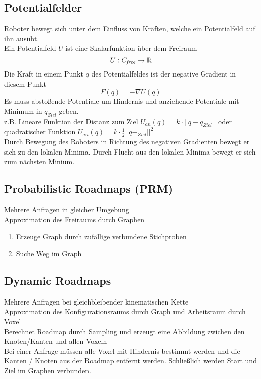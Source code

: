 \subsection{Potentialfelder}
Roboter bewegt sich unter dem Einfluss von Kräften, welche ein Potentialfeld auf ihn ausübt.\\
Ein Potentialfeld \(U\) ist eine Skalarfunktion über dem Freiraum \[U: C_{\mathit{free}} \rightarrow \mathbb{R}\]
Die Kraft in einem Punkt \(q\) des Potentialfeldes ist der negative Gradient in diesem Punkt
\[F(q) = - \nabla U(q)\]
Es muss abstoßende Potentiale um Hindernis und anziehende Potentiale mit Minimum in \(q_{\mathit{Ziel}}\) geben.\\
z.B. Lineare Funktion der Distanz zum Ziel \( U_{\mathit{an}}(q) = k \cdot || q - q_{\mathit{Ziel}} ||\)
oder quadratischer Funktion \(U_{\mathit{an}}(q) = k \cdot \frac{1}{2} {|| q - _{\mathit{Ziel}}||}^2\)\\
Durch Bewegung des Roboters in Richtung des negativen Gradienten bewegt er sich zu den lokalen Minima.
Durch Flucht aus den lokalen Minima bewegt er sich zum nächsten Minium.


\subsection{Probabilistic Roadmaps (PRM)}
Mehrere Anfragen in gleicher Umgebung\\
Approximation des Freiraums durch Graphen
\begin{enumerate}
\item Erzeuge Graph durch zufällige verbundene Stichproben
\item Suche Weg im Graph
\end{enumerate}

\subsection{Dynamic Roadmaps}
Mehrere Anfragen bei gleichbleibender kinematischen Kette\\
Approximation des Konfigurationsraums durch Graph und Arbeitsraum durch Voxel\\

Berechnet Roadmap durch Sampling und erzeugt eine Abbildung zwichen den Knoten/Kanten und allen Voxeln\\
Bei einer Anfrage müssen alle Voxel mit Hindernis bestimmt werden und die Kanten / Knoten aus der Roadmap entfernt werden.
Schließlich werden Start und Ziel im Graphen verbunden.\\


